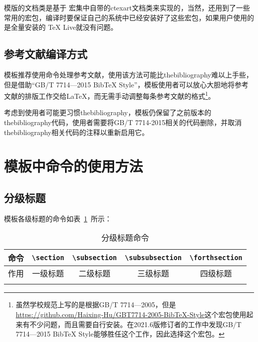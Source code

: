 模版的文档类是基于\CTeX{} 宏集中自带的ctexart文档类来实现的\cite{x5}，当然，还用到了一些常用的宏包，编译时要保证自己的系统中已经安装好了这些宏包，如果用户使用的是全量安装的 TeX Live就没有问题。

\subsection{参考文献编译方式}
模板推荐使用\verb||命令处理参考文献，使用该方法可能比thebibliography难以上手些，但是借助“GB/T 7714—2015 BibTeX Style”\cite{x6}，模板使用者可以放心大胆地将参考文献的排版工作交给\LaTeX ，而无需手动调整每条参考文献的格式\footnote{虽然学校规范上写的是根据GB/T 7714—2005，但是\url{https://github.com/Haixing-Hu/GBT7714-2005-BibTeX-Style}这个宏包使用起来有不少问题，而且需要自行安装。在2021.6版修订者的工作中发现GB/T 7714—2015 BibTeX Style能够胜任这个工作，因此选择这个宏包。}。

考虑到使用者可能更习惯thebibliography，模板仍保留了之前版本的thebibliography代码，使用者需要将GB/T 7714-2015相关的代码删除，并取消thebibliography相关代码的注释以重新启用它。

\section{模板中命令的使用方法}

\subsection{分级标题}
模板各级标题的命令如表~\ref{table_title_command}~所示：
\begin{table}[htbp!]
    \centering
    \caption{分级标题命令}\label{table_title_command}
    
    \begin{tabular}{ccccc}
    \whline 
    命令 & \verb|\section|&\verb|\subsection|&\verb|\subsubsection|&\verb|\forthsection| \\ 
    \hline 
    作用 & 一级标题&二级标题&三级标题&四级标题 \\ 
    \whline 
    \end{tabular}
\end{table}

